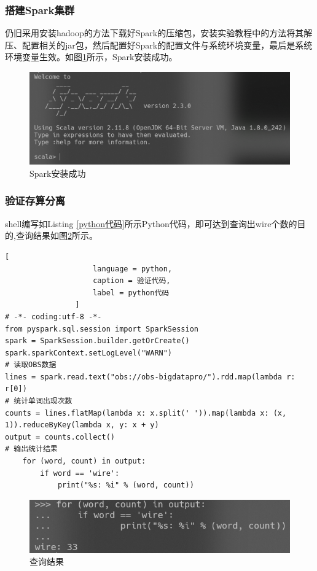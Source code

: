 \documentclass{../source/zjureport}
\begin{document}
            \subsubsection{搭建Spark集群}
                仍旧采用安装hadoop的方法下载好Spark的压缩包，安装实验教程中的方法将其解压、配置相关的jar包，然后配置好Spark的配置文件与系统环境变量，最后是系统环境变量生效。如图\ref{验证Spark的安装}所示，Spark安装成功。
                \begin{figure}[H]
                    \centering
                    \includegraphics[width = \textwidth]{figure/spark验证完成.png}
                    \caption{Spark安装成功}
                    \label{验证Spark的安装}
                \end{figure}

            \subsubsection{验证存算分离}
            shell编写如Listing \ref{python代码}所示Python代码，即可达到查询出wire个数的目的,查询结果如图\ref{查询结果}所示。
                \begin{lstlisting}[
                    language = python,
                    caption = 验证代码,
                    label = python代码
                ]
# -*- coding:utf-8 -*-
from pyspark.sql.session import SparkSession
spark = SparkSession.builder.getOrCreate()
spark.sparkContext.setLogLevel("WARN")
# 读取OBS数据
lines = spark.read.text("obs://obs-bigdatapro/").rdd.map(lambda r: r[0])
# 统计单词出现次数
counts = lines.flatMap(lambda x: x.split(' ')).map(lambda x: (x, 1)).reduceByKey(lambda x, y: x + y)
output = counts.collect()
# 输出统计结果
    for (word, count) in output:
        if word == 'wire':
            print("%s: %i" % (word, count))
    \end{lstlisting}
    \begin{figure}[H]
        \centering
        \includegraphics[width = \textwidth]{figure/结果.png}
        \caption{查询结果}
        \label{查询结果}
    \end{figure}
\end{document}
